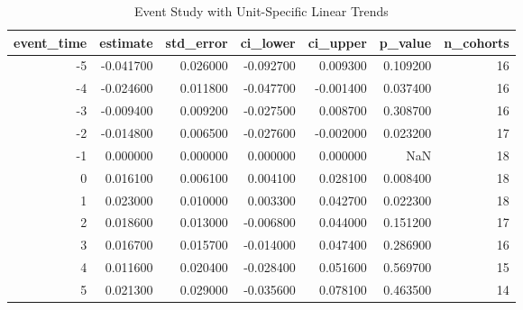 \begin{table}
\caption{Event Study with Unit-Specific Linear Trends}
\label{tab:unit_trends}
\begin{tabular}{rrrrrrr}
\toprule
event_time & estimate & std_error & ci_lower & ci_upper & p_value & n_cohorts \\
\midrule
-5 & -0.041700 & 0.026000 & -0.092700 & 0.009300 & 0.109200 & 16 \\
-4 & -0.024600 & 0.011800 & -0.047700 & -0.001400 & 0.037400 & 16 \\
-3 & -0.009400 & 0.009200 & -0.027500 & 0.008700 & 0.308700 & 16 \\
-2 & -0.014800 & 0.006500 & -0.027600 & -0.002000 & 0.023200 & 17 \\
-1 & 0.000000 & 0.000000 & 0.000000 & 0.000000 & NaN & 18 \\
0 & 0.016100 & 0.006100 & 0.004100 & 0.028100 & 0.008400 & 18 \\
1 & 0.023000 & 0.010000 & 0.003300 & 0.042700 & 0.022300 & 18 \\
2 & 0.018600 & 0.013000 & -0.006800 & 0.044000 & 0.151200 & 17 \\
3 & 0.016700 & 0.015700 & -0.014000 & 0.047400 & 0.286900 & 16 \\
4 & 0.011600 & 0.020400 & -0.028400 & 0.051600 & 0.569700 & 15 \\
5 & 0.021300 & 0.029000 & -0.035600 & 0.078100 & 0.463500 & 14 \\
\bottomrule
\end{tabular}
\end{table}
